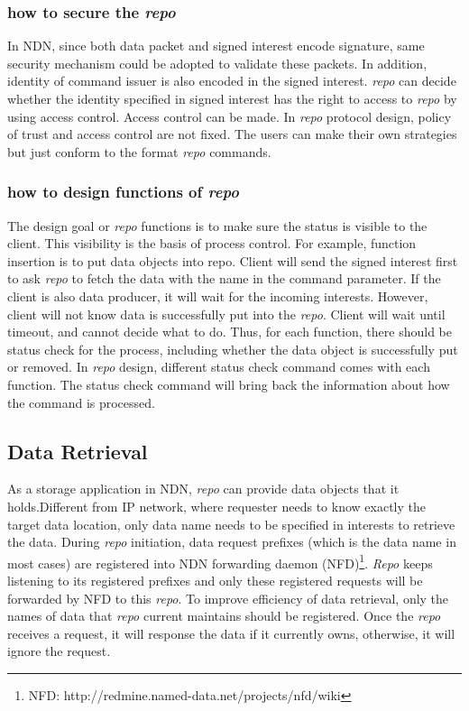 \documentclass[conference]{IEEEtran}
\begin{document}
\subsubsection{how to secure the \emph{repo}}

In NDN, since both data packet and signed interest encode signature, same security mechanism could be adopted to validate these packets. In addition, identity of command issuer is also encoded in the signed interest. \emph{repo} can decide whether the identity specified in signed interest has the right to access to \emph{repo} by using access control. Access control can be made. In \emph{repo} protocol design, policy of trust and access control are not fixed. The users can make their own strategies but just conform to the format \emph{repo} commands.

\subsubsection{how to design functions of \emph{repo}}

The design goal or \emph{repo} functions is to make sure the status is visible to the client. This visibility is the basis of process control. For example, function insertion is to put data objects into repo. Client will send the signed interest first to ask \emph{repo} to fetch the data with the name in the command parameter. If the client is also data producer, it will wait for the incoming interests. However, client will not know data is successfully put into the \emph{repo}. Client will wait until timeout, and cannot decide what to do. Thus, for each function, there should be status check for the process, including whether the data object is successfully put or removed. In \emph{repo} design, different status check command comes with each function. The status check command will bring back the information about how the command is processed.

\subsection{Data Retrieval}

As a storage application in NDN, \emph{repo} can provide data objects that it holds.Different from IP network, where requester needs to know exactly the target data location, only data name needs to be specified in interests to retrieve the data. During \emph{repo} initiation, data request prefixes (which is the data name in most cases) are registered into NDN forwarding daemon (NFD)\footnote{NFD: http://redmine.named-data.net/projects/nfd/wiki}. \emph{Repo} keeps listening to its registered prefixes and only these registered requests will be forwarded by NFD to this \emph{repo}. To improve efficiency of data retrieval, only the names of data that \emph{repo} current maintains should be registered. Once the \emph{repo} receives a request, it will response the data if it currently owns, otherwise, it will ignore the request.
\end{document}

